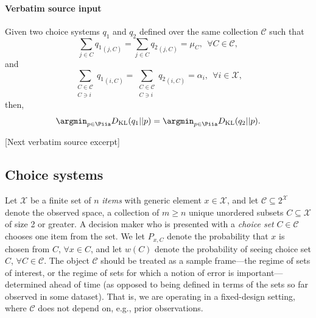 \documentclass[10pt]{article}
\begin{document}
\paragraph{Verbatim source input}
\begin{ReviewVerbatim}
\begin{lemma}\label{lemma:iia_invariance}
			Given two choice systems $q_1$ and $q_2$ defined over the same collection $\mathcal{C}$ such that
			$$
			\sum_{j \in C} {q_1}_{(j,C)} = \sum_{j \in C} {q_2}_{(j,C)} = \mu_C, \ \
			\forall C \in \mathcal{C},$$ and
			$$\sum_{\substack{C \in \mathcal{C}\\ C \ni i}} {q_1}_{(i,C)} = \sum_{\substack{C \in \mathcal{C}\\ C \ni i}} {q_2}_{(i,C)} = \alpha_i, \ \
			\forall i \in \mathcal{X},$$
			then,
			$$
			\argmin_{p \in \Piia}
			D_{\text{KL}}(q_1||p) =
			\argmin_{p \in \Piia}
			D_{\text{KL}}(q_2||p).
			$$
		\end{lemma}

[Next verbatim source excerpt]

	\subsection{Choice systems}\label{subsection:choice_system}
	Let $\mathcal{X}$ be a finite set of $n$ \textit{items} with generic element $x \in \mathcal{X}$, and let $\mathcal{C} \subseteq 2^\mathcal{X}$ denote the observed space, a collection of $m \geq n$ unique unordered subsets $C \subseteq \mathcal{X}$ of size 2 or greater. A decision maker who is presented with a \textit{choice set} $C \in \mathcal{C}$ chooses one item from the set. We let $P_{x,C}$ denote the probability that $x$ is chosen from $C$, $\forall x \in C$, and let $w(C)$ denote the probability of seeing choice set $C$, $\forall C \in \mathcal{C}$. The object $\mathcal{C}$ should be treated as a sample frame---the regime of sets of interest, or the regime of sets for which a notion of error is important---determined ahead of time (as opposed to being defined in terms of the sets so far observed in some dataset). That is, we are operating in a fixed-design setting, where $\mathcal{C}$ does not depend on, e.g., prior observations.


\end{ReviewVerbatim}
\end{document}

